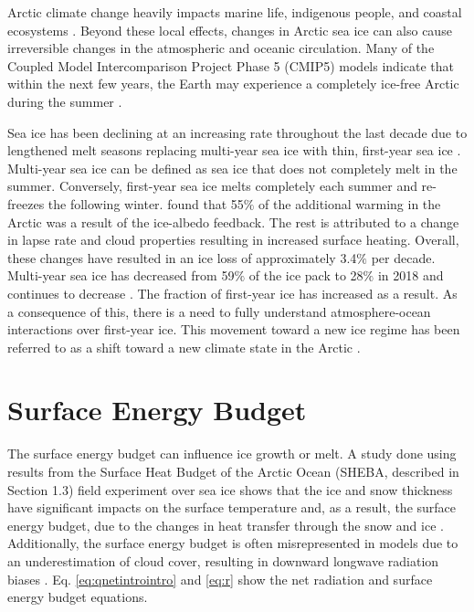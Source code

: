 Arctic climate change heavily impacts marine life, indigenous people, and coastal ecosystems \citep{ipcc_techsum}.  Beyond these local effects, changes in Arctic sea ice can also cause irreversible changes in the atmospheric and oceanic circulation. Many of the Coupled Model Intercomparison Project Phase 5 (CMIP5) models indicate that within the next few years, the Earth may experience a completely ice-free Arctic during the summer \citep{stroeve:2018}.

Sea ice has been declining at an increasing rate throughout the last decade due to lengthened melt seasons replacing multi-year sea ice  with thin, first-year sea ice \citep{meier:2014}. Multi-year sea ice can be defined as sea ice that does not completely melt in the summer. Conversely, first-year sea ice melts completely each summer and re-freezes the following winter. \citet{wunderling:2020} found that 55$\%$ of the additional warming in the Arctic was a result of the ice-albedo feedback. The rest is attributed to a change in lapse rate and cloud properties resulting in increased surface heating. Overall, these changes have resulted in an ice loss of approximately 3.4$\%$ per decade. Multi-year sea ice has decreased from 59$\%$ of the ice pack to 28$\%$ in 2018 and continues to decrease \citep{stroeve:2018}. The fraction of first-year ice has increased as a result. As a consequence of this, there is a need to fully understand atmosphere-ocean interactions over first-year ice. This movement toward a new ice regime has been referred to as a shift toward a new climate state in the Arctic \citep{verlinde:2007}. 

\section{Surface Energy Budget}
The surface energy budget can influence ice growth or melt. A study done using results from the Surface Heat Budget of the Arctic Ocean (SHEBA, described in Section 1.3) field experiment over sea ice shows that the ice and snow thickness have significant impacts on the surface temperature and, as a result, the surface energy budget, due to the changes in heat transfer through the snow and ice \citep{hines:2015}. Additionally, the surface energy budget is often misrepresented in models due to an underestimation of cloud cover, resulting in downward longwave radiation biases \citep{inoue:2008}. Eq. \ref{eq:qnetintrointro} and \ref{eq:r} show the net radiation and surface energy budget equations.


